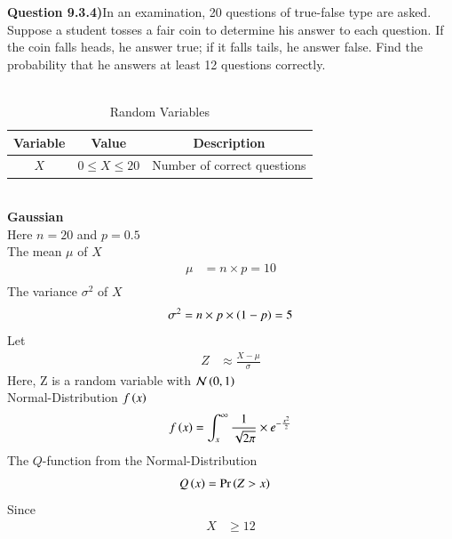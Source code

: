 \documentclass[journal,12pt,twocolumn]{IEEEtran}
\theoremstyle{remark}
\begin{document}
\textbf{Question 9.3.4)}In an examination, 20 questions of true-false type are asked. Suppose a student tosses
a fair coin to determine his answer to each question. If the coin falls heads, he answer
true; if it falls tails, he answer false. Find the probability that he answers at least 12
questions correctly.\\
\solution \\
\begin{table}[ht]
    \centering
    \caption{Random Variables}
    \label{table:random-variables-9.3.4}
\begin{tabular}{|c|c|c|}
\hline
Variable & Value & Description \\
\hline
$X$ & $0 \le X \le 20$ & Number of correct questions \\
\hline
\end{tabular} 
\end{table}\\
\textbf{Gaussian}\\
Here $n=20$ and $p=0.5$\\
The mean $\mu$ of $X$
\begin{align}
\mu &= n\times p= 10\\
\end{align}
The variance $\sigma^{2}$ of $X$
\begin{align}
\sigma^{2} &= n\times p \times \left(1-p\right)= 5\\
\end{align}
Let
\begin{align}
Z &\approx \frac{X-\mu}{\sigma}
\end{align}
Here, Z is a random variable with $\mathcal{N}\left(0,1\right)$ \\
Normal-Distribution $f\left(x\right)$
\begin{align}
	f\left(x\right) = \int_{x}^{\infty}\frac{1}{\sqrt{2\pi}} \times e^{-\frac{x^2}{2}}
\end{align}
The $Q$-function from the Normal-Distribution
\begin{align}
	Q\left(x\right) &= \Pr\left(Z>x\right)
\end{align}
Since
\begin{align}
X &\ge 12
\end{align}
\end{document}
